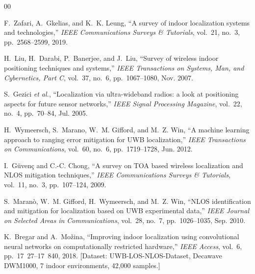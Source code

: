 \documentclass[conference]{IEEEtran}
\begin{document}
\begin{thebibliography}{00}

F.~Zafari, A.~Gkelias, and K.~K. Leung,
``A survey of indoor localization systems and technologies,''
\textit{IEEE Communications Surveys \& Tutorials}, vol.~21, no.~3,
pp.~2568--2599, 2019.

H.~Liu, H.~Darabi, P.~Banerjee, and J.~Liu,
``Survey of wireless indoor positioning techniques and systems,''
\textit{IEEE Transactions on Systems, Man, and Cybernetics, Part C},
vol.~37, no.~6, pp.~1067--1080, Nov. 2007.

S.~Gezici \textit{et al.},
``Localization via ultra-wideband radios: a look at positioning aspects
for future sensor networks,''
\textit{IEEE Signal Processing Magazine}, vol.~22, no.~4,
pp.~70--84, Jul. 2005.

H.~Wymeersch, S.~Marano, W.~M. Gifford, and M.~Z. Win,
``A machine learning approach to ranging error mitigation for UWB localization,''
\textit{IEEE Transactions on Communications}, vol.~60, no.~6,
pp.~1719--1728, Jun. 2012.

I.~G\"{u}ven\c{c} and C.-C. Chong,
``A survey on TOA based wireless localization and NLOS mitigation techniques,''
\textit{IEEE Communications Surveys \& Tutorials}, vol.~11, no.~3,
pp.~107--124, 2009.

S.~Maran\`{o}, W.~M. Gifford, H.~Wymeersch, and M.~Z. Win,
``NLOS identification and mitigation for localization based on UWB experimental data,''
\textit{IEEE Journal on Selected Areas in Communications}, vol.~28, no.~7,
pp.~1026--1035, Sep. 2010.

K.~Bregar and A.~Mo\v{z}ina,
``Improving indoor localization using convolutional neural networks on
computationally restricted hardware,''
\textit{IEEE Access}, vol.~6, pp.~17~27--17~840, 2018.
[Dataset: UWB-LOS-NLOS-Dataset, Decawave DWM1000, 7 indoor environments,
42{,}000 samples.]

\end{thebibliography}
\end{document}
